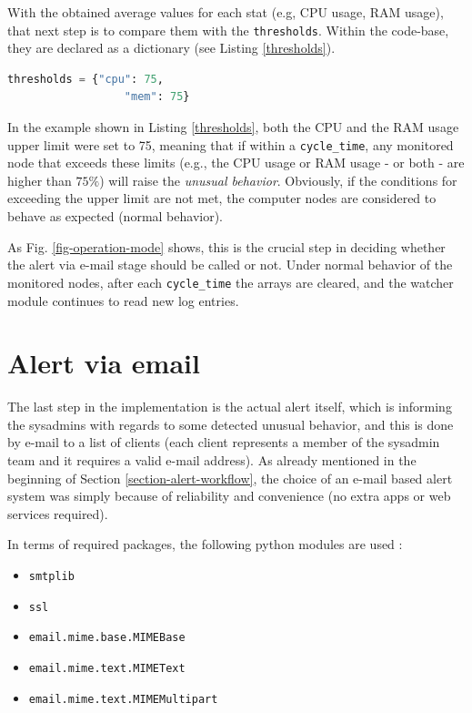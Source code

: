 \documentclass[conference]{IEEEtran}
\begin{document}
With the obtained average values for each stat (e.g, CPU usage, RAM usage), that next step is to compare them with the \texttt{thresholds}. Within the code-base, they are declared as a dictionary (see Listing \ref{thresholds}).

\begin{lstlisting}[language=Python, caption=Declaration of some thresholds within the code-base.,basicstyle=\footnotesize,label={thresholds}]
    thresholds = {"cpu": 75,
                  "mem": 75}
\end{lstlisting}

In the example shown in Listing \ref{thresholds}, both the CPU and the RAM usage upper limit were set to 75, meaning that if within a \texttt{cycle\_time}, any monitored node that exceeds these limits (e.g., the CPU usage or RAM usage - or both - are higher than $75\%$)  will raise the \emph{unusual behavior}. Obviously, if the conditions for exceeding the upper limit are not met, the computer nodes are considered to behave as expected (normal behavior).
\par As Fig. \ref{fig-operation-mode} shows, this is the crucial step in deciding whether the alert via e-mail stage should be called or not. Under normal behavior of the monitored nodes, after each \texttt{cycle\_time} the arrays are cleared, and the watcher module continues to read new log entries.

\section{Alert via email}
\label{section-email-alert}

The last step in the implementation is the actual alert itself, which is informing the sysadmins with regards to some detected unusual behavior, and this is done by e-mail to a list of clients (each client represents a member of the sysadmin team and it requires a valid e-mail address). As already mentioned in the beginning of Section \ref{section-alert-workflow}, the choice of an e-mail based alert system was simply because of reliability and convenience (no extra apps or web services required).
\par In terms of required packages, the following python modules are used \cite{emails}:
\begin{itemize}
    \item \texttt{smtplib}
    \item \texttt{ssl}
    \item \texttt{email.mime.base.MIMEBase}
    \item \texttt{email.mime.text.MIMEText}
    \item \texttt{email.mime.text.MIMEMultipart}
\end{itemize}
\end{document}
